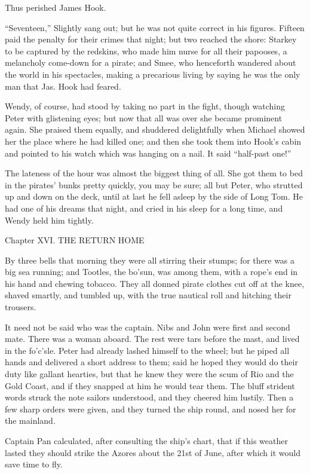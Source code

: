 Thus perished James Hook.

``Seventeen,'' Slightly sang out; but he was not quite correct in his
figures. Fifteen paid the penalty for their crimes that night; but two
reached the shore: Starkey to be captured by the redskins, who made him
nurse for all their papooses, a melancholy come-down for a pirate; and
Smee, who henceforth wandered about the world in his spectacles, making
a precarious living by saying he was the only man that Jas. Hook had
feared.

Wendy, of course, had stood by taking no part in the fight, though
watching Peter with glistening eyes; but now that all was over she
became prominent again. She praised them equally, and shuddered
delightfully when Michael showed her the place where he had killed one;
and then she took them into Hook's cabin and pointed to his watch which
was hanging on a nail. It said ``half-past one!''

The lateness of the hour was almost the biggest thing of all. She got
them to bed in the pirates' bunks pretty quickly, you may be sure; all
but Peter, who strutted up and down on the deck, until at last he fell
asleep by the side of Long Tom. He had one of his dreams that night,
and cried in his sleep for a long time, and Wendy held him tightly.




Chapter XVI.
THE RETURN HOME


By three bells that morning they were all stirring their stumps; for
there was a big sea running; and Tootles, the bo'sun, was among them,
with a rope's end in his hand and chewing tobacco. They all donned
pirate clothes cut off at the knee, shaved smartly, and tumbled up,
with the true nautical roll and hitching their trousers.

It need not be said who was the captain. Nibs and John were first and
second mate. There was a woman aboard. The rest were tars before the
mast, and lived in the fo'c'sle. Peter had already lashed himself to
the wheel; but he piped all hands and delivered a short address to
them; said he hoped they would do their duty like gallant hearties, but
that he knew they were the scum of Rio and the Gold Coast, and if they
snapped at him he would tear them. The bluff strident words struck the
note sailors understood, and they cheered him lustily. Then a few sharp
orders were given, and they turned the ship round, and nosed her for
the mainland.

Captain Pan calculated, after consulting the ship's chart, that if this
weather lasted they should strike the Azores about the 21st of June,
after which it would save time to fly.


